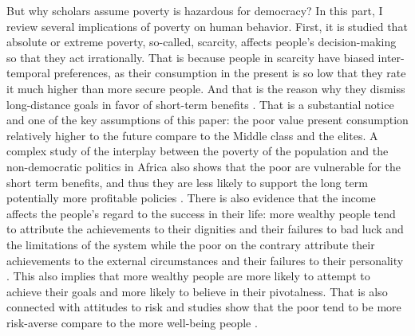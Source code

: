 \documentclass[a4paper, 12pt]{article}
\begin{document}
	But why scholars assume poverty is hazardous for democracy? In this part, I review several implications of poverty on human behavior. First, it is studied that absolute or extreme poverty, so-called, scarcity, affects people's decision-making so that they act irrationally. That is because people in scarcity have biased inter-temporal preferences, as their consumption in the present is so low that they rate it much higher than more secure people. And that is the reason why they dismiss long-distance goals in favor of short-term benefits \parencite{scarcity, poverty_consequences}. That is a substantial notice and one of the key assumptions of this paper: the poor value present consumption relatively higher to the future compare to the Middle class and the elites. A complex study of the interplay between the poverty of the population and the non-democratic politics in Africa also shows that the poor are vulnerable for the short term benefits, and thus they are less likely to support the long term potentially more profitable policies \parencite{poverty_interplay}. There is also evidence that the income affects the people's regard to the success in their life: more wealthy people tend to attribute the achievements to their dignities and their failures to bad luck and the limitations of the system while the poor on the contrary attribute their achievements to the external circumstances and their failures to their personality \parencite{poverty_ideology}. This also implies that more wealthy people are more likely to attempt to achieve their goals and more likely to believe in their pivotalness. That is also connected with attitudes to risk and studies show that the poor tend to be more risk-averse compare to the more well-being people \parencite{poverty_risk}.
	\\\\
\end{document}
